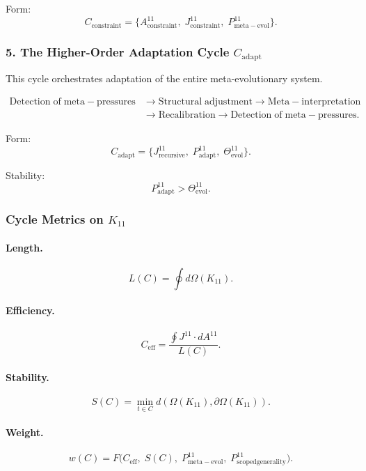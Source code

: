 Form:
\[
 C_{\mathrm{constraint}}
 =
 \{
   A^{11}_{\mathrm{constraint}},\;
   J^{11}_{\mathrm{constraint}},\;
   P^{11}_{\mathrm{meta\!-\!evol}}
 \}.
\]


\subsubsection{5. The Higher-Order Adaptation Cycle $C_{\mathrm{adapt}}$}

This cycle orchestrates adaptation of the entire meta-evolutionary system.

\[
  \begin{aligned}
  \mathrm{Detection\;of\;meta\!-\!pressures}
  &\to \mathrm{Structural\;adjustment}
  \to \mathrm{Meta\!-\!interpretation}\\
  &\to \mathrm{Recalibration}
  \to \mathrm{Detection\;of\;meta\!-\!pressures}.
  \end{aligned}
\]

Form:
\[
  C_{\mathrm{adapt}}
  =
  \{
    J^{11}_{\mathrm{recursive}},\;
    P^{11}_{\mathrm{adapt}},\;
    \Theta^{11}_{\mathrm{evol}}
  \}.
\]

Stability:
\[
  P^{11}_{\mathrm{adapt}}>\Theta^{11}_{\mathrm{evol}}.
\]


\subsubsection{Cycle Metrics on $K_{11}$}

\paragraph{Length.}
\[
  L(C)=\oint d\Omega(K_{11}).
\]

\paragraph{Efficiency.}
\[
  C_{\mathrm{eff}}
  =\frac{\oint J^{11}\cdot dA^{11}}{L(C)}.
\]

\paragraph{Stability.}
\[
  S(C)
  =\min_{t\in C} d(\Omega(K_{11}),\partial\Omega(K_{11})).
\]

\paragraph{Weight.}
\[
  w(C)
  =F\!\big(
        C_{\mathrm{eff}},\;
        S(C),\;
        P^{11}_{\mathrm{meta\!-\!evol}},\;
        P^{11}_{\mathrm{scoped generality}}
      \big).
\]


